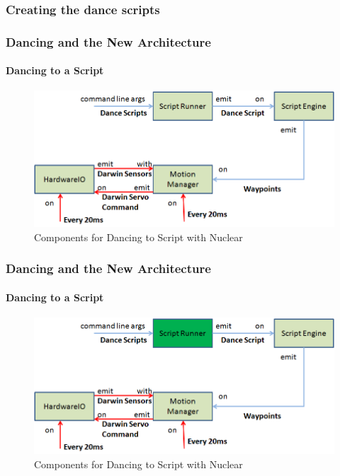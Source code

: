 \documentclass{beamer}
\begin{document}
	\begin{frame}
		\frametitle{Creating the dance scripts}
	\end{frame}	
	\begin{frame}
		\frametitle{Dancing and the New Architecture}
		\framesubtitle{Dancing to a Script}
		\begin{figure}
			\centering
			\includegraphics[scale=.5]{Presentation_Images/dance_script_new_arc.png}
			\caption{Components for Dancing to Script with Nuclear}
		\end{figure}
	\end{frame}	
	\begin{frame}
		\frametitle{Dancing and the New Architecture}
		\framesubtitle{Dancing to a Script}
		\begin{figure}
			\centering
			\includegraphics[scale=.5]{Presentation_Images/dance_script_new_arc_change.png}
			\caption{Components for Dancing to Script with Nuclear}
		\end{figure}
	\end{frame}	
\end{document}
